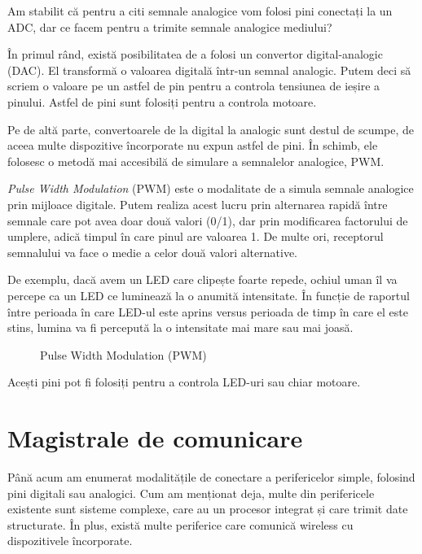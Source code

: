 Am stabilit că pentru a citi semnale analogice vom folosi pini conectați la un
ADC, dar ce facem pentru a trimite semnale analogice mediului?

În primul rând, există posibilitatea de a folosi un convertor digital-analogic
(DAC). El transformă o valoarea digitală într-un semnal analogic. Putem deci să
scriem o valoare pe un astfel de pin pentru a controla tensiunea de ieșire a
pinului. Astfel de pini sunt folosiți pentru a controla motoare.

Pe de altă parte, convertoarele de la digital la analogic sunt destul de scumpe,
de aceea multe dispozitive încorporate nu expun astfel de pini. În schimb, ele
folosesc o metodă mai accesibilă de simulare a semnalelor analogice, PWM.

\textit{Pulse Width Modulation} (PWM) este o modalitate de a simula semnale analogice
prin mijloace digitale. Putem realiza acest lucru prin alternarea rapidă între
semnale care pot avea doar două valori (0/1), dar prin modificarea factorului de
umplere, adică timpul în care pinul are valoarea 1. De multe ori, receptorul
semnalului va face o medie a celor două valori alternative.

De exemplu, dacă avem un LED care clipește foarte repede, ochiul uman îl va
percepe ca un LED ce luminează la o anumită intensitate. În funcție de raportul
între perioada în care LED-ul este aprins versus perioada de timp în care el
este stins, lumina va fi percepută la o intensitate mai mare sau mai joasă.

\begin{figure}[htbp]
	\centering
	\def\svgwidth{\columnwidth}
        
        \caption{Pulse Width Modulation (PWM)}
	\label{fig:embed-pwm}
\end{figure}

Acești pini pot fi folosiți pentru a controla LED-uri sau chiar motoare.

\section{Magistrale de comunicare}
\label{sec:embed:bus}

Până acum am enumerat modalitățile de conectare a perifericelor simple, folosind
pini digitali sau analogici. Cum am menționat deja, multe din perifericele
existente sunt sisteme complexe, care au un procesor integrat și care trimit
date structurate. În plus, există multe periferice care comunică wireless cu
dispozitivele încorporate.

